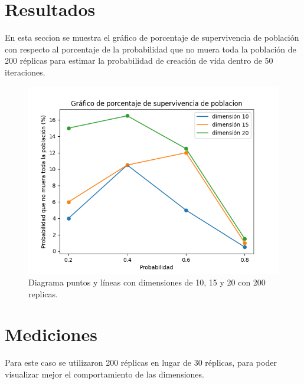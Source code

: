 \documentclass{article}
\begin{document}
{\begin{lstlisting}
\end{lstlisting}

\section{Resultados}

En esta seccion se muestra el gráfico de porcentaje de supervivencia de población con respecto al porcentaje de la probabilidad que no muera toda la población de 200 réplicas para estimar la probabilidad de creación de vida dentro de 50 iteraciones.

\newpage
\begin{figure}
    \centering
    \includegraphics[width=200mm]{Figure_1.png}
    \caption{Diagrama puntos y líneas con dimensiones de 10, 15 y 20 con 200 replicas.}
    \label{figure}
\end{figure}

\section{Mediciones}

Para este caso se utilizaron 200 réplicas en lugar de 30 réplicas, para poder visualizar mejor el comportamiento de las dimensiones.

}
\end{document}
